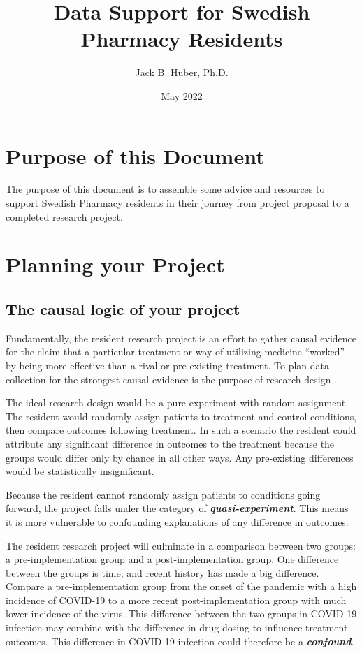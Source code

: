 \documentclass[
]{report}
\title{Data Support for Swedish Pharmacy Residents}
\author{Jack B. Huber, Ph.D.}
\date{May 2022}
\begin{document}
\maketitle

\hypertarget{purpose-of-this-document}{%
\chapter{Purpose of this Document}\label{purpose-of-this-document}}

The purpose of this document is to assemble some advice and resources to
support Swedish Pharmacy residents in their journey from project
proposal to a completed research project.

\hypertarget{planning-your-project}{%
\chapter{Planning your Project}\label{planning-your-project}}

\hypertarget{the-causal-logic-of-your-project}{%
\section{The causal logic of your
project}\label{the-causal-logic-of-your-project}}

Fundamentally, the resident research project is an effort to gather
causal evidence for the claim that a particular treatment or way of
utilizing medicine ``worked'' by being more effective than a rival or
pre-existing treatment. To plan data collection for the strongest causal
evidence is the purpose of research design \citep{CampbellStanley1963}.

The ideal research design would be a pure experiment with random
assignment. The resident would randomly assign patients to treatment and
control conditions, then compare outcomes following treatment. In such a
scenario the resident could attribute any significant difference in
outcomes to the treatment because the groups would differ only by chance
in all other ways. Any pre-existing differences would be statistically
insignificant.

Because the resident cannot randomly assign patients to conditions going
forward, the project falls under the category of
\emph{\textbf{quasi-experiment}}. This means it is more vulnerable to
confounding explanations of any difference in outcomes.

The resident research project will culminate in a comparison between two
groups: a pre-implementation group and a post-implementation group. One
difference between the groups is time, and recent history has made a big
difference. Compare a pre-implementation group from the onset of the
pandemic with a high incidence of COVID-19 to a more recent
post-implementation group with much lower incidence of the virus. This
difference between the two groups in COVID-19 infection may combine with
the difference in drug dosing to influence treatment outcomes. This
difference in COVID-19 infection could therefore be a
\emph{\textbf{confound}}.
\end{document}
